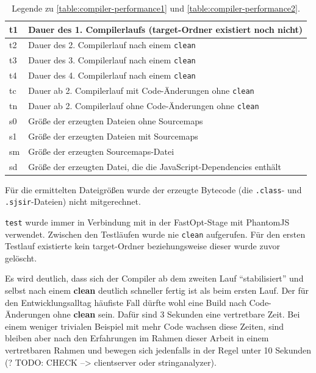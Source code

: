 \documentclass[a4paper, 12pt, hidelinks, listof=totoc, listoftables=totoc, bibliography=totoc]{scrreprt}
\begin{document}
\begin{table}[!h]
\begin{tabular}{|l|l|}
\hline t1 & Dauer des 1. Compilerlaufs (target-Ordner existiert noch nicht) \\ 
\hline t2 & Dauer des 2. Compilerlauf nach einem \texttt{clean} \\ 
\hline t3 & Dauer des 3. Compilerlauf nach einem \texttt{clean} \\ 
\hline t4 & Dauer des 4. Compilerlauf nach einem \texttt{clean} \\ 
\hline tc & Dauer ab 2. Compilerlauf mit Code-Änderungen ohne \texttt{clean} \\ 
\hline tn & Dauer ab 2. Compilerlauf ohne Code-Änderungen ohne \texttt{clean} \\ 
\hline s0 & Größe der erzeugten Dateien ohne Sourcemaps \\ 
\hline s1 & Größe der erzeugten Dateien mit Sourcemaps \\ 
\hline sm & Größe der erzeugten Sourcemaps-Datei \\ 
\hline sd & Größe der erzeugten Datei, die die JavaScript-Dependencies enthält \\ 
\hline 
\end{tabular} 
\caption{Legende zu \ref{table:compiler-performance1} und \ref{table:compiler-performance2}.}
\label{table:compiler-performance-legend}
\end{table}

\medskip

Für die ermittelten Dateigrößen wurde der erzeugte Bytecode (die \texttt{.class}- und \texttt{.sjsir}-Dateien) nicht mitgerechnet.

\texttt{test} wurde immer in Verbindung mit in der FastOpt-Stage mit PhantomJS verwendet. Zwischen den Testläufen wurde nie \texttt{clean} aufgerufen. Für den ersten Testlauf existierte kein target-Ordner beziehungsweise dieser wurde zuvor gelöscht.

Es wird deutlich, dass sich der Compiler ab dem zweiten Lauf "`stabilisiert"' und selbst nach einem \textbf{clean} deutlich schneller fertig ist als beim ersten Lauf. Der für den Entwicklungsalltag häufiste Fall dürfte wohl eine Build nach Code-Änderungen ohne \textbf{clean} sein. Dafür sind 3 Sekunden eine vertretbare Zeit. Bei einem weniger trivialen Beispiel mit mehr Code wachsen diese Zeiten, sind bleiben aber nach den Erfahrungen im Rahmen dieser Arbeit in einem vertretbaren Rahmen und bewegen sich jedenfalls in der Regel unter 10 Sekunden (? TODO: CHECK --> clientserver oder stringanalyzer).
\end{document}
